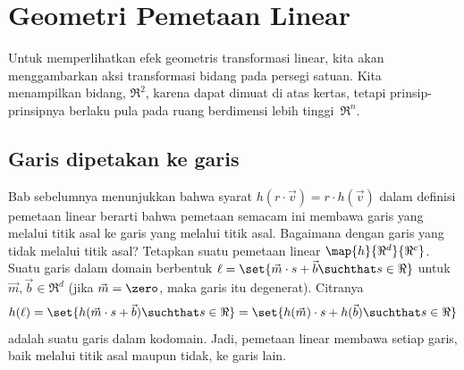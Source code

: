 \chapter{Geometri Pemetaan Linear}

Untuk memperlihatkan efek geometris transformasi linear,
kita akan menggambarkan aksi
transformasi bidang pada persegi satuan.
Kita menampilkan bidang, $\Re^2$,
karena dapat dimuat di atas kertas, tetapi prinsip-prinsipnya berlaku pula pada
ruang berdimensi lebih tinggi~$\Re^n$.




\section{Garis dipetakan ke garis}
Bab sebelumnya menunjukkan bahwa
syarat $h(r\cdot \vec{v})=r\cdot h(\vec{v})$ dalam definisi
pemetaan linear berarti bahwa
pemetaan semacam ini membawa garis yang melalui titik asal ke garis yang melalui titik asal.
Bagaimana dengan garis yang tidak melalui titik asal?
Tetapkan suatu pemetaan linear $\map{h}{\Re^d}{\Re^c}$.
Suatu garis dalam domain berbentuk
$\ell = \set{\vec{m}\cdot s +\vec{b}\suchthat s\in\Re}$
untuk~$\vec{m}, \vec{b}\in\Re^d$ (jika $\vec{m}=\zero$, maka garis itu degenerat).
Citranya
\begin{equation*}
  h(\ell)=\set{h(\vec{m}\cdot s+\vec{b})\suchthat s\in\Re}
  =\set{h(\vec{m})\cdot s+h(\vec{b})\suchthat s\in\Re}
\end{equation*}
adalah suatu garis dalam kodomain.
Jadi, pemetaan linear membawa setiap garis, baik melalui titik asal maupun tidak, ke garis lain.

